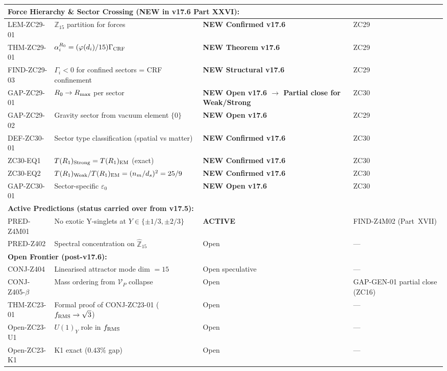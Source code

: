 \documentclass[12pt, a4paper]{article}
\begin{document}
\begin{keybox}[title={Master Z-Programme Status Table v17.6 (Canonical, Post-v17.6 Closures)}]
{\begin{longtable}{p{2.8cm} p{6.5cm} p{1.8cm} p{3.4cm}}
\midrule
\multicolumn{4}{l}{\textbf{Force Hierarchy \& Sector Crossing (NEW in v17.6 Part XXVI):}} \\
\midrule
LEM-ZC29-01 & $\mathbb{Z}_{15}$ partition for forces
   & \textbf{NEW Confirmed v17.6} & ZC29 \\
THM-ZC29-01 & $\alpha_i^{R_0} = (\varphi(d_i)/15)\Gamma_{\rm CRF}$
   & \textbf{NEW Theorem v17.6} & ZC29 \\
FIND-ZC29-03 & $\Gamma_i < 0$ for confined sectors = CRF confinement
   & \textbf{NEW Structural v17.6} & ZC29 \\
GAP-ZC29-01 & $R_0 \to R_{\rm max}$ per sector
   & \textbf{NEW Open v17.6 $\to$ Partial close for Weak/Strong} & ZC30 \\
GAP-ZC29-02 & Gravity sector from vacuum element $\{0\}$
   & \textbf{NEW Open v17.6} & ZC29 \\
DEF-ZC30-01 & Sector type classification (spatial vs matter)
   & \textbf{NEW Confirmed v17.6} & ZC30 \\
ZC30-EQ1 & $T(R_1)_{\rm Strong} = T(R_1)_{\rm EM}$ (exact)
   & \textbf{NEW Confirmed v17.6} & ZC30 \\
ZC30-EQ2 & $T(R_1)_{\rm Weak}/T(R_1)_{\rm EM} = (n_m/d_s)^2 = 25/9$
   & \textbf{NEW Confirmed v17.6} & ZC30 \\
GAP-ZC30-01 & Sector-specific $\varepsilon_0$
   & \textbf{NEW Open v17.6} & ZC30 \\

\midrule
\multicolumn{4}{l}{\textbf{Active Predictions (status carried over from v17.5):}} \\
\midrule
PRED-Z4M01 & No exotic Y-singlets at $Y \in \{\pm 1/3, \pm 2/3\}$
   & \textbf{ACTIVE} & FIND-Z4M02 (Part~XVII) \\
PRED-Z402 & Spectral concentration on $\widehat{\mathbb{Z}}_{15}$
   & Open & --- \\

\midrule
\multicolumn{4}{l}{\textbf{Open Frontier (post-v17.6):}} \\
\midrule
CONJ-Z404 & Linearised attractor mode dim $= 15$
   & Open speculative & --- \\
CONJ-Z405-$\beta$ & Mass ordering from $\mathcal{V}_P$ collapse
   & Open & GAP-GEN-01 partial close (ZC16) \\
THM-ZC23-01 & Formal proof of CONJ-ZC23-01 ($f_{\rm RMS} \to \sqrt{3}$)
   & Open & --- \\
Open-ZC23-U1 & $U(1)_Y$ role in $f_{\rm RMS}$
   & Open & --- \\
Open-ZC23-K1 & K1 exact ($0.43\%$ gap)
   & Open & --- \\

\bottomrule
\end{longtable}
}
\end{keybox}
\end{document}
